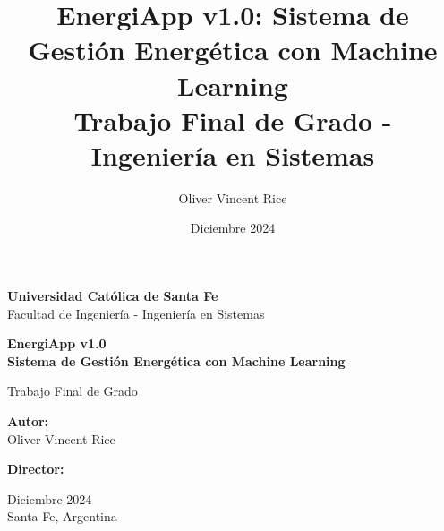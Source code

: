 \documentclass[12pt,a4paper,spanish]{book}
\title{
    \textbf{\Huge EnergiApp v1.0: Sistema de Gestión Energética con Machine Learning} \\
    \vspace{1cm}
    \Large Trabajo Final de Grado - Ingeniería en Sistemas
}
\author{Oliver Vincent Rice}
\date{Diciembre 2024}
\begin{document}
\begin{titlepage}
    \centering
    \vspace*{1cm}
    
    
    \vspace{1.5cm}
    
    {\huge\textbf{Universidad Católica de Santa Fe}}\\
    \vspace{0.5cm}
    {\Large Facultad de Ingeniería - Ingeniería en Sistemas}\\
    
    \vspace{2cm}
    
    {\Huge\textbf{EnergiApp v1.0}}\\
    \vspace{0.5cm}
    {\Large\textbf{Sistema de Gestión Energética con Machine Learning}}\\
    
    \vspace{1.5cm}
    
    {\Large Trabajo Final de Grado}\\
    
    \vspace{2cm}
    
    \begin{minipage}{0.45\textwidth}
        \begin{flushleft}
            \textbf{Autor:}\\
            Oliver Vincent Rice
        \end{flushleft}
    \end{minipage}
    \begin{minipage}{0.45\textwidth}
        \begin{flushright}
            \textbf{Director:}\\
            [Nombre del Director]
        \end{flushright}
    \end{minipage}
    
    \vfill
    
    {\large Diciembre 2024}\\
    {\large Santa Fe, Argentina}
    
\end{titlepage}
\end{document}

